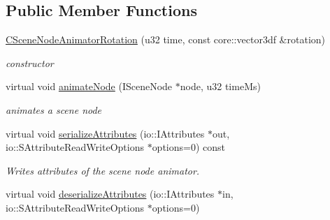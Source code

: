 \subsection*{Public Member Functions}
\begin{DoxyCompactItemize}
\item 
\hypertarget{classirr_1_1scene_1_1_c_scene_node_animator_rotation_a77ab78baa3bd17eeabf891c7fe5cbc6e}{\hyperlink{classirr_1_1scene_1_1_c_scene_node_animator_rotation_a77ab78baa3bd17eeabf891c7fe5cbc6e}{C\-Scene\-Node\-Animator\-Rotation} (u32 time, const core\-::vector3df \&rotation)}\label{classirr_1_1scene_1_1_c_scene_node_animator_rotation_a77ab78baa3bd17eeabf891c7fe5cbc6e}

\begin{DoxyCompactList}\small\item\em constructor \end{DoxyCompactList}\item 
\hypertarget{classirr_1_1scene_1_1_c_scene_node_animator_rotation_a727130f72dd70e7c8c97fd572f32c898}{virtual void \hyperlink{classirr_1_1scene_1_1_c_scene_node_animator_rotation_a727130f72dd70e7c8c97fd572f32c898}{animate\-Node} (I\-Scene\-Node $\ast$node, u32 time\-Ms)}\label{classirr_1_1scene_1_1_c_scene_node_animator_rotation_a727130f72dd70e7c8c97fd572f32c898}

\begin{DoxyCompactList}\small\item\em animates a scene node \end{DoxyCompactList}\item 
\hypertarget{classirr_1_1scene_1_1_c_scene_node_animator_rotation_ae68ad1797c66dcb489b667a96cbbdb8d}{virtual void \hyperlink{classirr_1_1scene_1_1_c_scene_node_animator_rotation_ae68ad1797c66dcb489b667a96cbbdb8d}{serialize\-Attributes} (io\-::\-I\-Attributes $\ast$out, io\-::\-S\-Attribute\-Read\-Write\-Options $\ast$options=0) const }\label{classirr_1_1scene_1_1_c_scene_node_animator_rotation_ae68ad1797c66dcb489b667a96cbbdb8d}

\begin{DoxyCompactList}\small\item\em Writes attributes of the scene node animator. \end{DoxyCompactList}\item 
\hypertarget{classirr_1_1scene_1_1_c_scene_node_animator_rotation_aedcadfbb1d21d9bcc48b50599354abd8}{virtual void \hyperlink{classirr_1_1scene_1_1_c_scene_node_animator_rotation_aedcadfbb1d21d9bcc48b50599354abd8}{deserialize\-Attributes} (io\-::\-I\-Attributes $\ast$in, io\-::\-S\-Attribute\-Read\-Write\-Options $\ast$options=0)}\label{classirr_1_1scene_1_1_c_scene_node_animator_rotation_aedcadfbb1d21d9bcc48b50599354abd8}


\end{DoxyCompactItemize}
